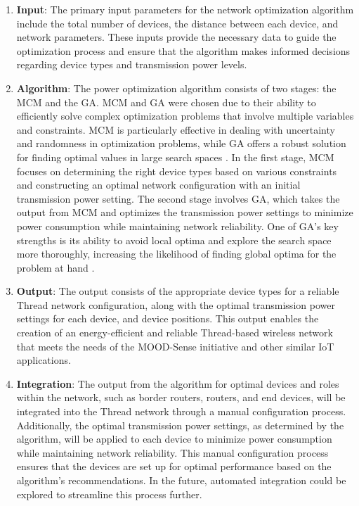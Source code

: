 \begin{enumerate}
    \item \textbf{Input}: The primary input parameters for the network optimization algorithm include the total number of devices, the distance between each device, and network parameters. These inputs provide the necessary data to guide the optimization process and ensure that the algorithm makes informed decisions regarding device types and transmission power levels.
    \item \textbf{Algorithm}: The power optimization algorithm consists of two stages: the \acrfull{MCM} and the \acrfull{GA}. \gls{MCM} and \gls{GA} were chosen due to their ability to efficiently solve complex optimization problems that involve multiple variables and constraints. \gls{MCM} is particularly effective in dealing with uncertainty and randomness in optimization problems, while \gls{GA} offers a robust solution for finding optimal values in large search spaces \cite{kroese2014monte}. In the first stage, \gls{MCM} focuses on determining the right device types based on various constraints and constructing an optimal network configuration with an initial transmission power setting. The second stage involves \gls{GA}, which takes the output from \gls{MCM} and optimizes the transmission power settings to minimize power consumption while maintaining network reliability. One of \gls{GA}'s key strengths is its ability to avoid local optima and explore the search space more thoroughly, increasing the likelihood of finding global optima for the problem at hand \cite{lambora2019genetic}.
    \item \textbf{Output}: The output consists of the appropriate device types for a reliable Thread network configuration, along with the optimal transmission power settings for each device, and device positions. This output enables the creation of an energy-efficient and reliable Thread-based wireless network that meets the needs of the MOOD-Sense initiative and other similar \gls{IoT} applications.
    \item \textbf{Integration}: The output from the algorithm for optimal devices and roles within the network, such as border routers, routers, and end devices, will be integrated into the Thread network through a manual configuration process. Additionally, the optimal transmission power settings, as determined by the algorithm, will be applied to each device to minimize power consumption while maintaining network reliability. This manual configuration process ensures that the devices are set up for optimal performance based on the algorithm's recommendations. In the future, automated integration could be explored to streamline this process further.
\end{enumerate}

